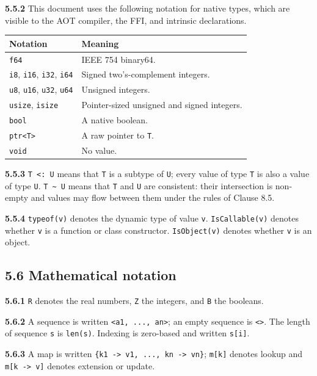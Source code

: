 \documentclass[
  english,
  11pt,
  a4paper,
]{article}
\begin{document}
\textbf{5.5.2} This document uses the following notation for native
types, which are visible to the AOT compiler, the FFI, and intrinsic
declarations.

\begin{longtable}[]{@{}ll@{}}
\toprule\noalign{}
Notation & Meaning \\
\midrule\noalign{}
\endhead
\bottomrule\noalign{}
\endlastfoot
\texttt{f64} & IEEE 754 binary64. \\
\texttt{i8}, \texttt{i16}, \texttt{i32}, \texttt{i64} & Signed
two's-complement integers. \\
\texttt{u8}, \texttt{u16}, \texttt{u32}, \texttt{u64} & Unsigned
integers. \\
\texttt{usize}, \texttt{isize} & Pointer-sized unsigned and signed
integers. \\
\texttt{bool} & A native boolean. \\
\texttt{ptr\textless{}T\textgreater{}} & A raw pointer to \texttt{T}. \\
\texttt{void} & No value. \\
\end{longtable}

\textbf{5.5.3} \texttt{T\ \textless{}:\ U} means that \texttt{T} is a
subtype of \texttt{U}; every value of type \texttt{T} is also a value of
type \texttt{U}. \texttt{T\ \textasciitilde{}\ U} means that \texttt{T}
and \texttt{U} are consistent: their intersection is non-empty and
values may flow between them under the rules of Clause 8.5.

\textbf{5.5.4} \texttt{typeof(v)} denotes the dynamic type of value
\texttt{v}. \texttt{IsCallable(v)} denotes whether \texttt{v} is a
function or class constructor. \texttt{IsObject(v)} denotes whether
\texttt{v} is an object.

\subsection{5.6 Mathematical notation}\label{mathematical-notation}

\textbf{5.6.1} \texttt{R} denotes the real numbers, \texttt{Z} the
integers, and \texttt{B} the booleans.

\textbf{5.6.2} A sequence is written
\texttt{\textless{}a1,\ ...,\ an\textgreater{}}; an empty sequence is
\texttt{\textless{}\textgreater{}}. The length of sequence \texttt{s} is
\texttt{len(s)}. Indexing is zero-based and written \texttt{s{[}i{]}}.

\textbf{5.6.3} A map is written
\texttt{\{k1\ -\textgreater{}\ v1,\ ...,\ kn\ -\textgreater{}\ vn\}};
\texttt{m{[}k{]}} denotes lookup and
\texttt{m{[}k\ -\textgreater{}\ v{]}} denotes extension or update.
\end{document}
